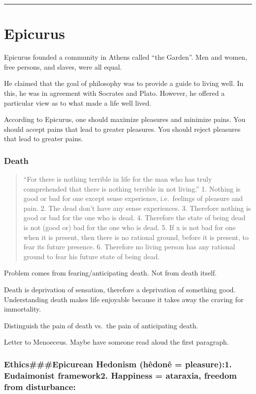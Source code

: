\documentclass[]{article}
\date{}
\begin{document}
\begin{center}\rule{0.5\linewidth}{\linethickness}\end{center}

\section{Epicurus}

Epicurus founded a community in Athens called ``the Garden''. Men and
women, free persons, and slaves, were all equal.

He claimed that the goal of philosophy was to provide a guide to living
well. In this, he was in agreement with Socrates and Plato. However, he
offered a particular view as to what made a life well lived.

According to Epicurus, one should maximize pleasures and minimize pains.
You should accept pains that lead to greater pleasures. You should
reject pleasures that lead to greater pains.

\subsubsection{Death}\label{death}

\begin{quote}
``For there is nothing terrible in life for the man who has truly
comprehended that there is nothing terrible in not living.'' 1. Nothing
is good or bad for one except sense experience, i.e.~feelings of
pleasure and pain. 2. The dead don't have any sense experiences. 3.
Therefore nothing is good or bad for the one who is dead. 4. Therefore
the state of being dead is not (good or) bad for the one who is dead. 5.
If x is not bad for one when it is present, then there is no rational
ground, before it is present, to fear its future presence. 6. Therefore
no living person has any rational ground to fear his future state of
being dead.
\end{quote}

Problem comes from fearing/anticipating death. Not from death itself.

Death is deprivation of sensation, therefore a deprivation of something
good. Understanding death makes life enjoyable because it takes away the
craving for immortality.

Distinguish the pain of death vs.~the pain of anticipating death.

Letter to Menoeceus. Maybe have someone read aloud the first paragraph.

\subsubsection{Ethics\#\#\#\textbf{Epicurean Hedonism (hêdonê =
pleasure):}1. Eudaimonist framework2. Happiness = ataraxia, freedom from
disturbance:}\label{ethicsepicurean-hedonism-huxeadonuxea-pleasure1.-eudaimonist-framework2.-happiness-ataraxia-freedom-from-disturbance}
\end{document}
